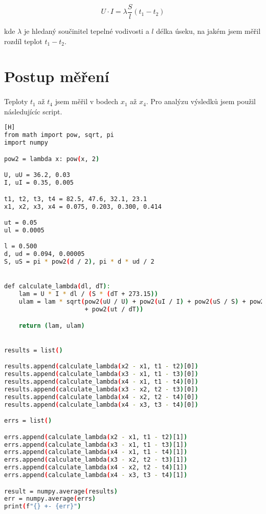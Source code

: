 \documentclass[a4paper,11pt]{article}
\begin{document}
    \begin{equation}
        U \cdot I = \lambda \frac{S}{l} \left(t_{1} - t_{2}\right)
    \end{equation}

    kde $\lambda$ je hledaný součinitel tepelné vodivosti a $l$ délka úseku,
    na jakém jsem měřil rozdíl teplot $t_{1} - t_{2}$.

\section{Postup měření}

    \paragraph{} Teploty $t_{1}$ až $t_{4}$ jsem měřil v bodech $x_{1}$ až
    $x_{4}$. Pro analýzu výsledků jsem použil následujícíc script.

\begin{lstlisting}[language=Bash][H]
from math import pow, sqrt, pi
import numpy

pow2 = lambda x: pow(x, 2)

U, uU = 36.2, 0.03
I, uI = 0.35, 0.005

t1, t2, t3, t4 = 82.5, 47.6, 32.1, 23.1
x1, x2, x3, x4 = 0.075, 0.203, 0.300, 0.414

ut = 0.05
ul = 0.0005

l = 0.500
d, ud = 0.094, 0.00005
S, uS = pi * pow2(d / 2), pi * d * ud / 2


def calculate_lambda(dl, dT):
    lam = U * I * dl / (S * (dT + 273.15))
    ulam = lam * sqrt(pow2(uU / U) + pow2(uI / I) + pow2(uS / S) + pow2(ul / dl)
                      + pow2(ut / dT))

    return (lam, ulam)


results = list()

results.append(calculate_lambda(x2 - x1, t1 - t2)[0])
results.append(calculate_lambda(x3 - x1, t1 - t3)[0])
results.append(calculate_lambda(x4 - x1, t1 - t4)[0])
results.append(calculate_lambda(x3 - x2, t2 - t3)[0])
results.append(calculate_lambda(x4 - x2, t2 - t4)[0])
results.append(calculate_lambda(x4 - x3, t3 - t4)[0])

errs = list()

errs.append(calculate_lambda(x2 - x1, t1 - t2)[1])
errs.append(calculate_lambda(x3 - x1, t1 - t3)[1])
errs.append(calculate_lambda(x4 - x1, t1 - t4)[1])
errs.append(calculate_lambda(x3 - x2, t2 - t3)[1])
errs.append(calculate_lambda(x4 - x2, t2 - t4)[1])
errs.append(calculate_lambda(x4 - x3, t3 - t4)[1])

result = numpy.average(results)
err = numpy.average(errs)
print(f"{} +- {err}") \end{lstlisting}
\end{document}
